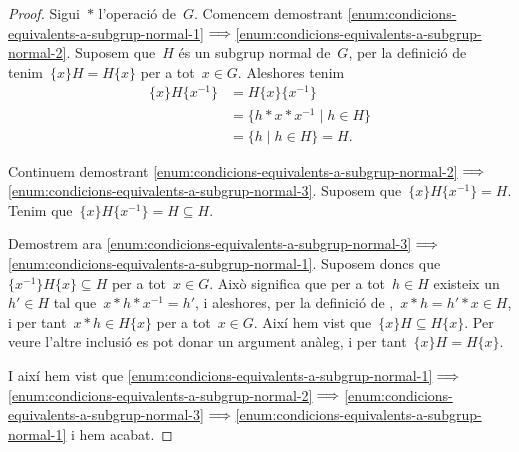 \documentclass[../../main.tex]{subfiles}
\begin{document}
    \begin{proof}
        Sigui~\(\ast\) l'operació de~\(G\).
        Comencem demostrant \eqref{enum:condicions-equivalents-a-subgrup-normal-1}\(\implies\)\eqref{enum:condicions-equivalents-a-subgrup-normal-2}.
        Suposem que~\(H\) és un subgrup normal de~\(G\), per la definició de  tenim~\(\{x\}H=H\{x\}\) per a tot~\(x\in G\).
        Aleshores tenim
        \begin{align*}
        \{x\}H\{x^{-1}\}&=H\{x\}\{x^{-1}\}\\
        &=\{h\ast x\ast x^{-1}\mid h\in H\}\\
        &=\{h\mid h\in H\}=H.
        \end{align*}

        Continuem demostrant \eqref{enum:condicions-equivalents-a-subgrup-normal-2}\(\implies\)\eqref{enum:condicions-equivalents-a-subgrup-normal-3}.
        Suposem que~\(\{x\}H\{x^{-1}\}=H\).
        Tenim que~\(\{x\}H\{x^{-1}\}=H\subseteq H\).

        Demostrem ara \eqref{enum:condicions-equivalents-a-subgrup-normal-3}\(\implies\)\eqref{enum:condicions-equivalents-a-subgrup-normal-1}.
        Suposem doncs que~\(\{x^{-1}\}H\{x\}\subseteq H\) per a tot~\(x\in G\).
        Això significa que per a tot~\(h\in H\) existeix un~\(h'\in H\) tal que~\(x\ast h\ast x^{-1}=h'\), i aleshores, per la definició de ,~\(x\ast h=h'\ast x\in H\), i per tant~\(x\ast h\in H\{x\}\) per a tot~\(x\in G\).
        Així hem vist que~\(\{x\}H\subseteq H\{x\}\).
        Per veure l'altre inclusió es pot donar un argument anàleg, i per tant~\(\{x\}H= H\{x\}\).

        I així hem vist que \eqref{enum:condicions-equivalents-a-subgrup-normal-1}\(\implies\)\eqref{enum:condicions-equivalents-a-subgrup-normal-2}\(\implies\)\eqref{enum:condicions-equivalents-a-subgrup-normal-3}\(\implies\)\eqref{enum:condicions-equivalents-a-subgrup-normal-1} i hem acabat.
    \end{proof}
\end{document}
